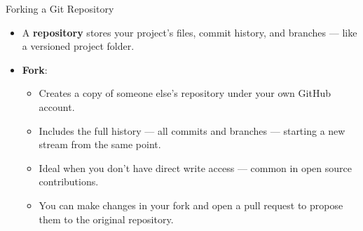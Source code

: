 \documentclass[12pt]{beamer}
\begin{document}
\begin{frame}{Forking a Git Repository}
  \begin{itemize}
    \item A \textbf{repository} stores your project’s files, commit history, and branches — like a versioned project folder.

    \item \textbf{Fork}:
    \begin{itemize}
      \setlength\itemsep{0.5em}
      \item Creates a copy of someone else’s repository under your own GitHub account.
      \item Includes the full history — all commits and branches — starting a new stream from the same point.
      \item Ideal when you don’t have direct write access — common in open source contributions.
      \item You can make changes in your fork and open a pull request to propose them to the original repository.
    \end{itemize}
  \end{itemize}
\end{frame}

\begin{comment}
\begin{frame}{Git Commit}
  \begin{itemize}
    \item \textbf{Working Directory}: Your local project folder. Files here can be edited freely.
    \item \textbf{Staging Area (Index)}: A holding area for changes you want to include in the next commit.
    \item \textbf{Repository (Local)}: A database where Git permanently stores all versions of your project.
  \end{itemize}
  \vspace{1em}
  \begin{block}{Workflow}
    \texttt{working directory} $\rightarrow$ \texttt{staging area} $\rightarrow$ \texttt{repository}
  \end{block}
  \begin{itemize}
    \item Use \texttt{git add} to move changes to staging
    \item Use \texttt{git commit} to record changes to the repository
  \end{itemize}
\end{frame}

\begin{frame}{Essential Git Commands}
  \begin{itemize}
    \item \texttt{git init}
    \item \texttt{git status}
    \item \texttt{git add}
    \item \texttt{git commit}
    \item \texttt{git log}
    \item \texttt{git diff}
  \end{itemize}
\end{frame}
\end{comment}
\end{document}
